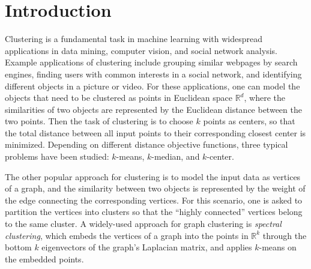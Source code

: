 
\section{Introduction}\label{sec:intro}

Clustering is a fundamental task in machine learning with widespread applications in data mining, computer vision, and social network analysis. Example applications of clustering include grouping similar webpages by search engines,  finding users with common interests in a social network, and identifying different objects in a picture or video. For these applications, one can model the objects that need to be clustered as points in Euclidean space $\mathbb{R}^d$, where the similarities of two objects are represented by the Euclidean distance between the two points. 
Then the task of clustering is to choose $k$ points as centers, so that the total distance between all input points to their corresponding closest center is minimized. Depending on different distance objective functions, three typical problems have been studied: $k$-means, $k$-median, and $k$-center.

The other popular approach for clustering is to model the input data as vertices of a graph, and the similarity between two objects is represented by the weight of the edge connecting the corresponding vertices. For this scenario, one is asked to partition the vertices into clusters so that the ``highly connected'' vertices belong to the same cluster. A widely-used approach for graph clustering  is \emph{spectral clustering}, which embeds the vertices of a graph into the points in $\mathbb{R}^k$ through the bottom $k$ eigenvectors of the graph's Laplacian matrix, and applies $k$-means on the embedded points.



